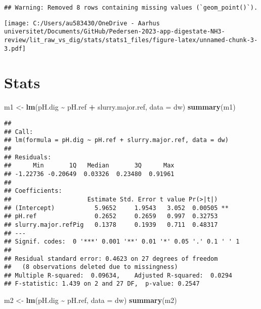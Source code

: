 \documentclass[
]{article}
\newenvironment{Shaded}{\begin{snugshade}}{\end{snugshade}}
\newcommand{\AttributeTok}[1]{\textcolor[rgb]{0.13,0.29,0.53}{#1}}
\newcommand{\FunctionTok}[1]{\textcolor[rgb]{0.13,0.29,0.53}{\textbf{#1}}}
\newcommand{\NormalTok}[1]{#1}
\newcommand{\OtherTok}[1]{\textcolor[rgb]{0.56,0.35,0.01}{#1}}
\newcommand{\SpecialCharTok}[1]{\textcolor[rgb]{0.81,0.36,0.00}{\textbf{#1}}}
\begin{document}
\begin{verbatim}
## Warning: Removed 8 rows containing missing values (`geom_point()`).
\end{verbatim}

\texttt{[image: C:/Users/au583430/OneDrive - Aarhus universitet/Documents/GitHub/Pedersen-2023-app-digestate-NH3-review/lit\_raw\_vs\_dig/stats/stats1\_files/figure-latex/unnamed-chunk-3-3.pdf]}

\hypertarget{stats}{%
\section{Stats}\label{stats}}

\begin{Shaded}
\begin{Highlighting}[]
\NormalTok{m1 }\OtherTok{\textless{}{-}} \FunctionTok{lm}\NormalTok{(pH.dig }\SpecialCharTok{\textasciitilde{}}\NormalTok{ pH.ref }\SpecialCharTok{+}\NormalTok{ slurry.major.ref, }\AttributeTok{data =}\NormalTok{ dw)}
\FunctionTok{summary}\NormalTok{(m1)}
\end{Highlighting}
\end{Shaded}

\begin{verbatim}
## 
## Call:
## lm(formula = pH.dig ~ pH.ref + slurry.major.ref, data = dw)
## 
## Residuals:
##      Min       1Q   Median       3Q      Max 
## -1.22736 -0.20649  0.03326  0.23480  0.91961 
## 
## Coefficients:
##                     Estimate Std. Error t value Pr(>|t|)   
## (Intercept)           5.9652     1.9543   3.052  0.00505 **
## pH.ref                0.2652     0.2659   0.997  0.32753   
## slurry.major.refPig   0.1378     0.1939   0.711  0.48317   
## ---
## Signif. codes:  0 '***' 0.001 '**' 0.01 '*' 0.05 '.' 0.1 ' ' 1
## 
## Residual standard error: 0.4623 on 27 degrees of freedom
##   (8 observations deleted due to missingness)
## Multiple R-squared:  0.09634,    Adjusted R-squared:  0.0294 
## F-statistic: 1.439 on 2 and 27 DF,  p-value: 0.2547
\end{verbatim}

\begin{Shaded}
\begin{Highlighting}[]
\NormalTok{m2 }\OtherTok{\textless{}{-}} \FunctionTok{lm}\NormalTok{(pH.dig }\SpecialCharTok{\textasciitilde{}}\NormalTok{ pH.ref, }\AttributeTok{data =}\NormalTok{ dw)}
\FunctionTok{summary}\NormalTok{(m2)}
\end{Highlighting}
\end{Shaded}
\end{document}
